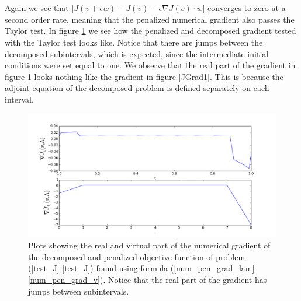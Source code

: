 \\
\\
Again we see that $|J(v+\epsilon w)-J(v)-\epsilon \nabla J(v)\cdot w|$ converges to zero at a second order rate, meaning that the penalized numerical gradient also passes the Taylor test. In figure \ref{JGrad2} we see how the penalized and decomposed gradient tested with the Taylor test looks like. Notice that there are jumps between the decomposed subintervals, which is expected, since the intermediate initial conditions were set equal to one. We observe that the real part of the gradient in figure \ref{JGrad2} looks nothing like the gradient in figure \ref{JGrad1}. This is because the adjoint equation of the decomposed problem is defined separately on each interval.
\begin{figure}[!h]
\centering
\includegraphics[scale=0.5]{pen_num_grad.png}
\caption{Plots showing the real and virtual part of the numerical gradient of the decomposed and penalized objective function of problem (\ref{test_J}-\ref{test_J}) found using formula (\ref{num_pen_grad_lam}-\ref{num_pen_grad_v}). Notice that the real part of the gradient has jumps between subintervals.}
\label{JGrad2}
\end{figure}
